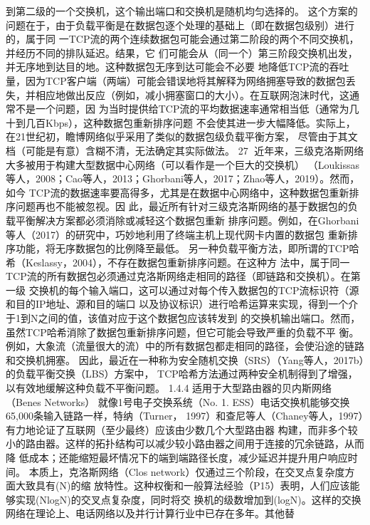 到第二级的一个交换机，这个输出端口和交换机是随机均匀选择的。
这个方案的问题在于，由于负载平衡是在数据包逐个处理的基础上（即在数据包级别）进行的，属于同
一TCP流的两个连续数据包可能会通过第二阶段的两个不同交换机，并经历不同的排队延迟。结果，它
们可能会从（同一个）第三阶段交换机出发，并无序地到达目的地。这种数据包无序到达可能会不必要
地降低TCP流的吞吐量，因为TCP客户端（两端）可能会错误地将其解释为网络拥塞导致的数据包丢
失，并相应地做出反应（例如，减小拥塞窗口的大小）。在互联网泡沫时代，这通常不是一个问题，因
为当时提供给TCP流的平均数据速率通常相当低（通常为几十到几百Kbps），这种数据包重新排序问题
不会使其进一步大幅降低。实际上，在21世纪初，瞻博网络似乎采用了类似的数据包级负载平衡方案，
尽管由于其文档（可能是有意）含糊不清，无法确定其实际做法。
                                                          27
近年来，三级克洛斯网络大多被用于构建大型数据中心网络（可以看作是一个巨大的交换机）
（Loukissas等人，2008；Cao等人，2013；Ghorbani等人，2017；Zhao等人，2019）。然而，如今
TCP流的数据速率要高得多，尤其是在数据中心网络中，这种数据包重新排序问题再也不能被忽视。因
此，最近所有针对三级克洛斯网络的基于数据包的负载平衡解决方案都必须消除或减轻这个数据包重新
排序问题。例如，在Ghorbani等人（2017）的研究中，巧妙地利用了终端主机上现代网卡内置的数据包
重新排序功能，将无序数据包的比例降至最低。
另一种负载平衡方法，即所谓的TCP哈希（Keslassy，2004），不存在数据包重新排序问题。在这种方
法中，属于同一TCP流的所有数据包必须通过克洛斯网络走相同的路径（即链路和交换机）。在第一级
交换机的每个输入端口，这可以通过对每个传入数据包的TCP流标识符（源和目的IP地址、源和目的端口
以及协议标识）进行哈希运算来实现，得到一个介于1到N之间的值，该值对应于这个数据包应该转发到
的交换机输出端口。然而，虽然TCP哈希消除了数据包重新排序问题，但它可能会导致严重的负载不平
衡。例如，大象流（流量很大的流）中的所有数据包都走相同的路径，会使沿途的链路和交换机拥塞。
因此，最近在一种称为安全随机交换（SRS）（Yang等人，2017b）的负载平衡交换（LBS）方案中，
TCP哈希方法通过两种安全机制得到了增强，以有效地缓解这种负载不平衡问题。
1.4.4 适用于大型路由器的贝内斯网络（Benes Networks）
就像1号电子交换系统（No. 1. ESS）电话交换机能够交换65,000条输入链路一样，特纳（Turner，
1997）和查尼等人（Chaney等人，1997）有力地论证了互联网（至少最终）应该由少数几个大型路由器
构建，而非多个较小的路由器。这样的拓扑结构可以减少较小路由器之间用于连接的冗余链路，从而降
低成本；还能缩短最坏情况下的端到端路径长度，减少延迟并提升用户响应时间。
本质上，克洛斯网络（Clos network）仅通过三个阶段，在交叉点复杂度方面大致具有(N)的缩
放特性。这种权衡和一般算法经验（P15）表明，人们应该能够实现(NlogN)的交叉点复杂度，同时将交
换机的级数增加到(logN)。这样的交换网络在理论上、电话网络以及并行计算行业中已存在多年。其他替
